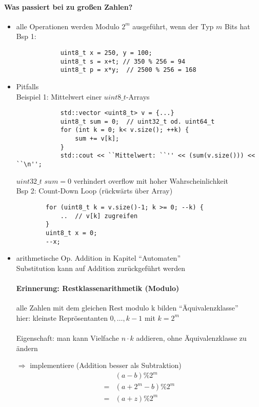\documentclass{article}
\begin{document}
	\paragraph{Was passiert bei zu großen Zahlen?}
	\begin{itemize}
		\item alle Operationen werden Modulo $2^m$ ausgeführt, wenn der Typ $m$ Bits hat \\
		Bsp 1:
		\begin{lstlisting}
			uint8_t x = 250, y = 100;
			uint8_t s = x+t; // 350 % 256 = 94
			uint8_t p = x*y;  // 2500 % 256 = 168
		\end{lstlisting}
		\item Pitfalls \\
		Beispiel 1: Mittelwert einer $uint8\_t$-Arrays
		\begin{lstlisting}
			std::vector <uint8_t> v = {...}
			uint8_t sum = 0;  // uint32_t od. uint64_t
			for (int k = 0; k< v.size(); ++k) {
				sum += v[k];
			}
			std::cout << ``Mittelwert: ``'' << (sum(v.size())) << ``\n'';
		\end{lstlisting}
		$uint32\_t$ $sum = 0$ verhindert overflow mit hoher Wahrscheinlichkeit\\

		Bsp 2: Count-Down Loop (rückwärts über Array)
	\begin{lstlisting}
		for (uint8_t k = v.size()-1; k >= 0; --k) {
			..  // v[k] zugreifen
		}
		uint8_t x = 0;
		--x;
	\end{lstlisting}

	\item arithmetische Op. Addition in Kapitel ``Automaten'' \\
	Substitution kann auf Addition zurückgeführt werden \\

	\paragraph{Erinnerung: Restklassenarithmetik (Modulo)}
	alle Zahlen mit dem gleichen Rest modulo k bilden ``Äquivalenzklasse'' \\

	hier: kleinste Reprösentanten $0, \dots , k-1$ mit $k=2^{m}$ \\ \\
	Eigenschaft: man kann Vielfache $n \cdot k$ addieren, ohne Äquivalenzklasse zu ändern

	$\Rightarrow$ implementiere (Addition besser als Subtraktion)
	\begin{align}
		&(a-b) \% 2^m \\
		= &(a+2^m-b)\%2^m \\
		= &(a+z)\% 2^m
	\end{align}

	\end{itemize}
\end{document}
